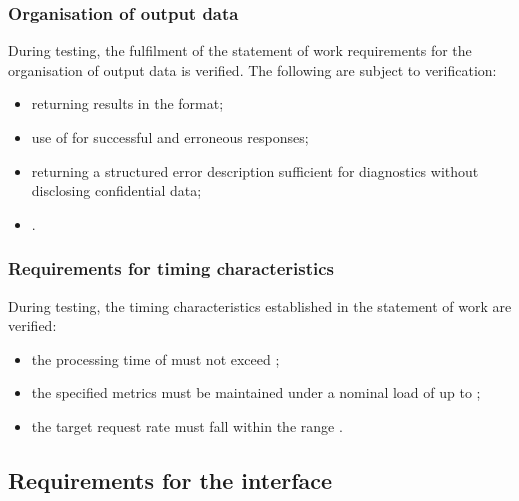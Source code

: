 \documentclass[12pt,a4paper]{extarticle}
\begin{document}
\subsubsection{Organisation of output data}

\begin{hseExample}
During testing, the fulfilment of the statement of work requirements for the organisation of output data is verified. The following are subject to verification:

\begin{itemize}[leftmargin=1.25cm]
    \item returning results in the  format;
    \item use of  for successful and erroneous responses;
    \item returning a structured error description sufficient for diagnostics without disclosing confidential data;
    \item {}.
\end{itemize}
\end{hseExample}

\subsubsection{Requirements for timing characteristics}

\begin{hseExample}
During testing, the timing characteristics established in the statement of work are verified:

\begin{itemize}[leftmargin=1.25cm]
    \item the processing time of  must not exceed ;
    \item the specified metrics must be maintained under a nominal load of up to ;
    \item the target request rate must fall within the range .
\end{itemize}
\end{hseExample}

\subsection{Requirements for the interface}
\end{document}
